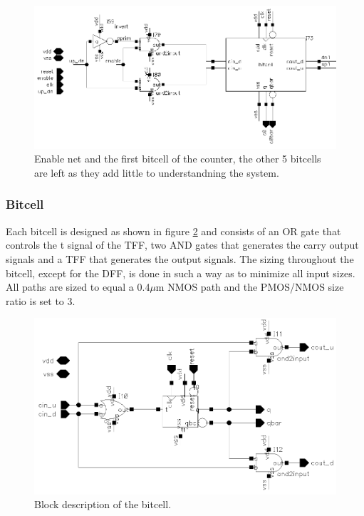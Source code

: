 \documentclass[a4paper,12pt]{article} \usepackage{graphicx}
\begin{document}
\begin{figure}[h]
        \centering
        \includegraphics[width=\textwidth]{../Bilder/counter_6bit/counter_6bit_top.png}
        \caption{Enable net and the first bitcell of the counter, the other 5 bitcells are
        left as they add little to understandning the system.}
        \label{fig:counter_top}
\end{figure}

\subsubsection{Bitcell}
Each bitcell is designed as shown in figure \ref{fig:counter_bitcell} and consists of an OR gate 
that controls the t signal of the TFF, two AND gates that generates the carry 
output signals and a TFF that generates the output signals.
The sizing throughout the bitcell, except for the DFF, is done in such a way as 
to minimize all input sizes. All paths are sized to equal a 0.4$\mu$m NMOS path
and the PMOS/NMOS size ratio is set to 3.

\begin{figure}[h]
        \centering
        \includegraphics[width=\textwidth]{../Bilder/counter_6bit/counter_6bit_bitcell.png}
        \caption{Block description of the bitcell.}
        \label{fig:counter_bitcell}
\end{figure}
\end{document}
